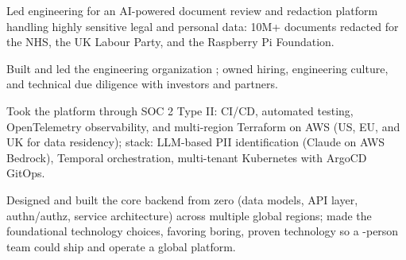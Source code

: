 \documentclass{standard-resume}
\begin{document}
\begin{bullets}
    \item Led engineering for an AI-powered document review and redaction
          platform handling highly sensitive legal and personal data: 10M+
          documents redacted for the NHS, the UK Labour Party, and the
          Raspberry Pi Foundation.\ 
    \item Built and led the engineering organization ; owned hiring, engineering culture, and technical due
          diligence with investors and partners.
    \item Took the platform through SOC 2 Type II\@: CI/CD, automated testing,
          OpenTelemetry observability, and multi-region Terraform on AWS (US,
          EU, and UK for data residency); stack: LLM-based PII identification
          (Claude on AWS Bedrock), Temporal orchestration, multi-tenant
          Kubernetes with ArgoCD GitOps.
\end{bullets}
\begin{bullets}
    \item Designed and built the core backend from zero (data models, API
          layer, authn/authz, service architecture) across multiple global
          regions; made the foundational technology choices, favoring boring,
          proven technology so a -person team could ship and operate
          a global platform.
\end{bullets}
\end{document}
